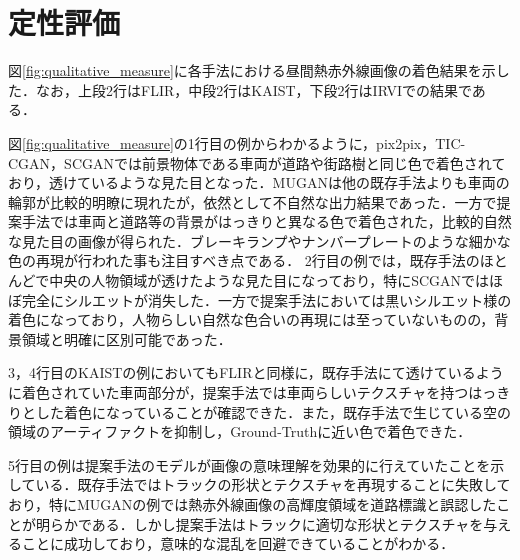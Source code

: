 \documentclass[11pt,dvipdfmx]{ujreport}
\begin{document}
\section{定性評価}
図\ref{fig:qualitative_measure}に各手法における昼間熱赤外線画像の着色結果を示した．なお，上段2行はFLIR，中段2行はKAIST，下段2行はIRVIでの結果である．\par
図\ref{fig:qualitative_measure}の1行目の例からわかるように，pix2pix，TIC-CGAN，SCGANでは前景物体である車両が道路や街路樹と同じ色で着色されており，透けているような見た目となった．MUGANは他の既存手法よりも車両の輪郭が比較的明瞭に現れたが，依然として不自然な出力結果であった．一方で提案手法では車両と道路等の背景がはっきりと異なる色で着色された，比較的自然な見た目の画像が得られた．ブレーキランプやナンバープレートのような細かな色の再現が行われた事も注目すべき点である．
2行目の例では，既存手法のほとんどで中央の人物領域が透けたような見た目になっており，特にSCGANではほぼ完全にシルエットが消失した．一方で提案手法においては黒いシルエット様の着色になっており，人物らしい自然な色合いの再現には至っていないものの，背景領域と明確に区別可能であった．\par
3，4行目のKAISTの例においてもFLIRと同様に，既存手法にて透けているように着色されていた車両部分が，提案手法では車両らしいテクスチャを持つはっきりとした着色になっていることが確認できた．また，既存手法で生じている空の領域のアーティファクトを抑制し，Ground-Truthに近い色で着色できた．\par
5行目の例は提案手法のモデルが画像の意味理解を効果的に行えていたことを示している．既存手法ではトラックの形状とテクスチャを再現することに失敗しており，特にMUGANの例では熱赤外線画像の高輝度領域を道路標識と誤認したことが明らかである．しかし提案手法はトラックに適切な形状とテクスチャを与えることに成功しており，意味的な混乱を回避できていることがわかる．
\end{document}

